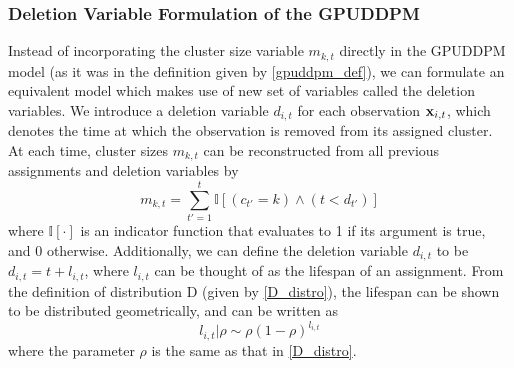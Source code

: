 \documentclass[twocolumn, final]{svjour3}
\begin{document}
\subsubsection{Deletion Variable Formulation of the GPUDDPM}
\label{sec:deletionvariableformulation}

Instead of incorporating the cluster size variable $m_{k,t}$ directly in the GPUDDPM model (as it was in the definition given by \eqref{gpuddpm_def}), we can formulate an equivalent model which makes use of new set of variables called the deletion variables. We introduce a deletion variable $d_{i,t}$ for each observation $\bold{x}_{i,t}$, which denotes the time at which the observation is removed from its assigned cluster. At each time, cluster sizes $m_{k,t}$ can be reconstructed from all previous assignments and deletion variables by
\begin{equation}
\label{compute_clust_size}
m_{k,t} = \sum_{t' = 1}^{t} \mathbb{I}[(c_{t'}=k) \wedge (t < d_{t'})]
\end{equation}
where $\mathbb{I}[\cdot]$ is an indicator function that evaluates to 1 if its argument is true, and 0 otherwise. Additionally, we can define the deletion variable $d_{i,t}$ to be $d_{i,t} = t + l_{i,t}$, where $l_{i,t}$ can be thought of as the lifespan of an assignment. From the definition of distribution D (given by \eqref{D_distro}), the lifespan can be shown to be distributed geometrically, and can be written as
\begin{equation}
\label{del_rho_form}
l_{i,t} | \rho  \sim  \rho(1 - \rho)^{l_{i,t}}
\end{equation}
where the parameter $\rho$ is the same as that in \eqref{D_distro}.
\end{document}
